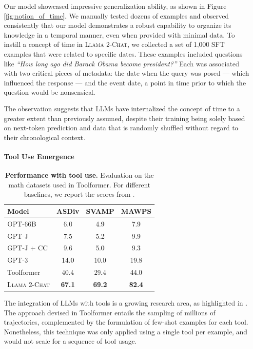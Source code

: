 \documentclass{article}
\newcommand{\modelname}{\textsc{Llama 2-Chat}\xspace}
\begin{document}
Our model showcased impressive generalization ability, as shown in Figure \ref{fig:notion_of_time}. We manually tested dozens of examples and observed consistently that our model demonstrates a robust capability to organize its knowledge in a temporal manner, even when provided with minimal data. To instill a concept of time in \modelname{}, we collected a set of 1,000 SFT examples that were related to specific dates. These examples included questions like \textit{``How long ago did Barack Obama become president?''} Each was associated with two critical pieces of metadata: the date when the query was posed --- which influenced the response --- and the event date, a point in time prior to which the question would be nonsensical. 

The observation suggests that LLMs have internalized the concept of time to a greater extent than previously assumed, despite their training being solely based on next-token prediction and data that is randomly shuffled without regard to their chronological context.



\paragraph{Tool Use Emergence}
\label{sec:tool_use_emergence}


\begin{table}
\centering
\begin{tabular}{l c c c} \toprule
 \bf Model &  \bf ASDiv &  \bf SVAMP &  \bf MAWPS \\ \midrule 
 OPT-66B & 6.0 & 4.9 & 7.9 \\ 
 GPT-J & 7.5 & 5.2 & 9.9 \\ GPT-J + CC & 9.6 & 5.0 & 9.3 \\ 
 GPT-3 & 14.0 & 10.0 & 19.8 \\ 
 Toolformer &  40.4 &  29.4 &   44.0 \\ 
\modelname{} & \bf 67.1 & \bf 69.2 & \bf 82.4 \\
\bottomrule \end{tabular}
\caption{\textbf{Performance with tool use.} Evaluation on the math datasets used in Toolformer. For different baselines, we report the scores from \cite{schick2023toolformer}.}
\label{tab:toolformer_eval}
\vspace{-0.8cm}
\end{table}

The integration of LLMs with tools is a growing research area, as highlighted in \cite{mialon2023augmented}. The approach devised in Toolformer \citep{schick2023toolformer} entails the sampling of millions of trajectories, complemented by the formulation of few-shot examples for each tool. Nonetheless, this technique was only applied using a single tool per example, and would not scale for a sequence of tool usage.
\end{document}

